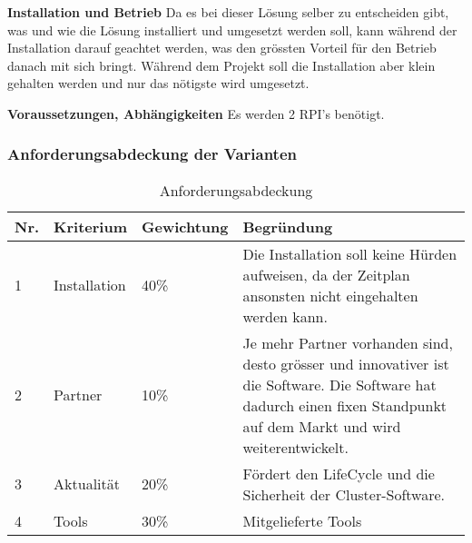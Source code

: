 \textbf{Installation und Betrieb}\newline
Da es bei dieser Lösung selber zu entscheiden gibt, was und wie die Lösung installiert und umgesetzt werden soll, kann während der Installation darauf geachtet werden, was den grössten Vorteil für den Betrieb danach mit sich bringt. Während dem Projekt soll die Installation aber klein gehalten werden und nur das nötigste wird umgesetzt. 

\textbf{Voraussetzungen, Abhängigkeiten}\newline
Es werden 2 RPI's benötigt.

\subsubsection{Anforderungsabdeckung der Varianten}

\begin{table}[H]
\centering
\begin{tabular}{p{1cm}p{2.5cm}p{2.2cm}p{10.3cm}}
\hline
\rowcolor{heading} \textbf{Nr.} & \textbf{Kriterium} & \textbf{Gewichtung} &\textbf{Begründung} \\\hline
1 & Installation & 40\% & Die Installation soll keine Hürden aufweisen, da der Zeitplan ansonsten nicht eingehalten werden kann. \\\hline
2 & Partner & 10\% & Je mehr Partner vorhanden sind, desto grösser und innovativer ist die Software. Die Software hat dadurch einen fixen Standpunkt auf dem Markt und wird weiterentwickelt. \\\hline
3 & Aktualität & 20\% & Fördert den LifeCycle und die Sicherheit der Cluster-Software. \\\hline
4 & Tools & 30\% & Mitgelieferte Tools \\\hline
\end{tabular}
\caption{Anforderungsabdeckung}
\end{table}

